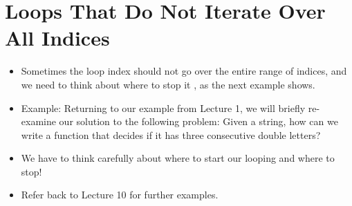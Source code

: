 \documentclass[letterpaper,10pt,english]{sphinxmanual}
\begin{document}
\section{Loops That Do Not Iterate Over All Indices}
\label{\detokenize{lecture_notes/lec12_loops2_for_double:loops-that-do-not-iterate-over-all-indices}}\begin{itemize}
\item {} 
Sometimes the loop index should not go over the entire range of
indices, and we need to think about where to stop it , as the
next example shows.

\item {} 
Example: Returning to our example from Lecture 1, we will briefly
re-examine our solution to the following problem: Given a string,
how can we write a function that decides if it has three
consecutive double letters?

\begin{sphinxVerbatim}[commandchars=\\\{\}]
 
          
         \PYG{p}{[}\PYG{p}{]}  \PYG{p}{[}  \PYG{p}{]}  \PYG{p}{[}  \PYG{p}{]}  \PYG{p}{[}  \PYG{p}{]}  \PYG{p}{[}  \PYG{p}{]}  \PYG{p}{[}  \PYG{p}{]}
             
     
\end{sphinxVerbatim}

\item {} 
We have to think carefully about where to start our looping and
where to stop!

\item {} 
Refer back to Lecture 10 for further examples.

\end{itemize}
\end{document}
